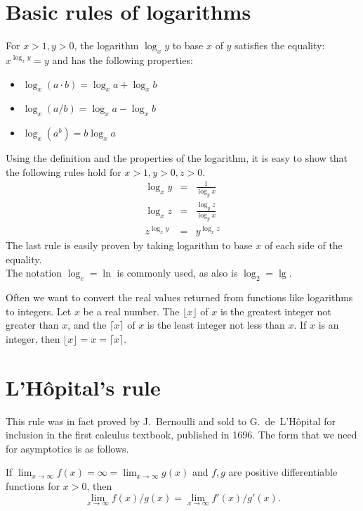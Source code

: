 \section{Basic rules of logarithms}

For $x>1, y > 0$, the logarithm \(\log_x y\) to base \(x\) of \(y\) satisfies the equality:
\(
x^{\log_x y} = y
\)
and has the following properties:
\begin{itemize}
\item \(\log_x ( a \cdot b ) = \log_x a + \log_x b\)
\item \(\log_x ( a / b )     = \log_x a - \log_x b\)
\item \(\log_x ( a^b )       = b \log_x a\)
\end{itemize}

Using the definition and the properties of the logarithm,
it is easy to show that the following rules hold for $x>1, y>0, z>0$.
\[
\begin{array}{lll} 
\log_x y & = & \frac{1}{\log_y x}\\
\log_x z & = & \frac{\log_y z}{\log_y x}\\
z^{\log_x y} & = & y^{\log_x z}
\end{array}
\]
The last rule is easily proven by taking logarithm to base
\(x\) of each side of the equality.\\

The notation $\log_{e} = \ln$ is commonly used, as also is $\log_2 = \lg$.

Often we want to convert the real values returned from functions like 
logarithms to integers. Let $x$ be a real number.
The  $\lfloor x \rfloor$ of $x$ is the greatest integer 
not greater than $x$, and the 
$\lceil x \rceil$ of $x$ is the least integer not less than $x$. If $x$ is an integer, then $\lfloor x \rfloor = x = \lceil x \rceil$.

\section{L'H\^{o}pital's rule}
\label{sec:app:lhopital}

This rule was in fact proved by J.~Bernoulli and sold to G.~de~L'H\^{o}pital for 
inclusion in the first calculus textbook, published in 1696. The form that we 
need for asymptotics is as follows.

\begin{Theorem}
If $\lim_{x\to \infty} f(x) = \infty = \lim_{x\to
\infty} g(x)$ and $f, g$ are positive differentiable functions for $x>0$,
then $$\lim_{x\to\infty} f(x)/g(x) = \lim_{x\to\infty} f'(x)/g'(x).$$
\end{Theorem}

